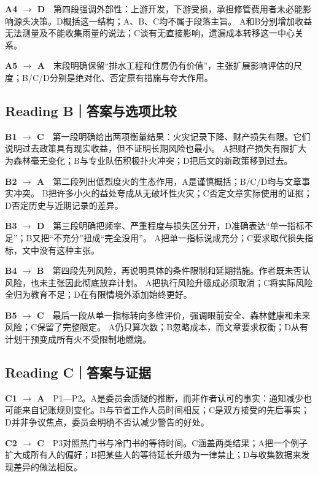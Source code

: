 \documentclass[a4paper,11pt,openany]{report}
\begin{document}
\textbf{A4 \(\rightarrow\) D}　第四段强调外部性：上游开发，下游受损，承担修管费用者未必能影响源头决策。D概括这一结构；A、B、C均不属于段落主旨。 A和B分别增加收益无法测量及不能收集雨量的说法；C谈有无直接影响，遗漏成本转移这一中心关系。

\textbf{A5 \(\rightarrow\) A}　末段明确保留``排水工程和住房仍有价值''，主张扩展影响评估的尺度；B/C/D分别是绝对化、否定原有措施与夸大作用。

\subsection{Reading B｜答案与选项比较}\label{reading-bux7b54ux6848ux4e0eux9009ux9879ux6bd4ux8f83}

\textbf{B1 \(\rightarrow\) C}　第一段明确给出两项衡量结果：火灾记录下降、财产损失有限。它们说明过去政策具有现实收益，但不证明长期风险也最小。 A把财产损失有限扩大为森林毫无变化；B与专业队伍积极扑火冲突；D把后文的新政策移到过去。

\textbf{B2 \(\rightarrow\) A}　第二段列出低烈度火的生态作用，A是谨慎概括；B/C/D均与文章事实冲突。 B把许多小火的益处夸成从无破坏性火灾；C否定文章实际使用的证据；D否定历史与近期记录的差异。

\textbf{B3 \(\rightarrow\) D}　第三段明确把频率、严重程度与损失区分开，D准确表达``单一指标不足''；B又把``不充分''扭成``完全没用''。 A把单一指标说成充分；C要求取代损失指标，文中没有这种主张。

\textbf{B4 \(\rightarrow\) B}　第四段先列风险，再说明具体的条件限制和延期措施。作者既未否认风险，也未主张因此彻底放弃计划。 A把执行风险升级成必须取消；C将实际风险全归为教育不足；D在有限情境外添加始终更好。

\textbf{B5 \(\rightarrow\) C}　最后一段从单一指标转向多维评价，强调眼前安全、森林健康和未来风险；C保留了完整限定。 A仍只算次数；B忽略成本，而文章要求权衡；D从有计划干预变成所有火不受限制地燃烧。

\subsection{Reading C｜答案与证据}\label{reading-cux7b54ux6848ux4e0eux8bc1ux636e}

\textbf{C1 \(\rightarrow\) A}　P1---P2。A是委员会质疑的推断，而非作者认可的事实：通知减少也可能来自记账规则变化。B与节省工作人员时间相反；C是双方接受的先后事实；D并非争议焦点，委员会明确不否认减少警告的好处。

\textbf{C2 \(\rightarrow\) C}　P3对照热门书与冷门书的等待时间。C涵盖两类结果；A把一个例子扩大成所有人的偏好；B把某些人的等待延长升级为一律禁止；D与收集数据来发现差异的做法相反。
\end{document}

